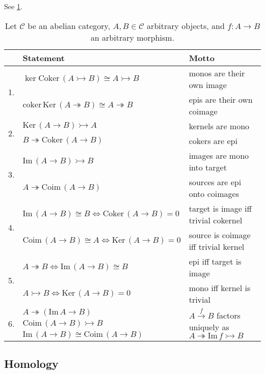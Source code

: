 \documentclass[10pt]{article}
\newcommand{\ccat}{\mathcal{C}}
\newcommand{\Coker}{\mathrm{Coker}\,}
\newcommand{\Coim}{\mathrm{Coim}\,}
\renewcommand{\Im}{\mathrm{Im}\,}
\newcommand{\Ker}{\mathrm{Ker}\,}
\newcommand{\coker}{\mathrm{coker}\,}
\newcommand{\mono}{\rightarrowtail}
\newcommand{\epi}{\twoheadrightarrow}
\begin{document}
            See \cref{tb:kernels-and-cokernels-in-abelian-category}.

            \begin{table}[!ht]
                \centering
                \begin{tabular}{rll}
                    & Statement & Motto\\[.2em]
                    \toprule
                    \multirow{2}{*}{1.}&$\ker\Coker(A\mono B)\cong A\mono B$ & monos are their own image\\
                    &$\coker\Ker(A\epi B)\cong A\epi B$ & epis are their own coimage\\[.4em]
                    \multirow{2}{*}{2.}&$\Ker(A\to B)\mono A$ & kernels are mono\\
                    &$B\epi\Coker(A\to B)$ & cokers are epi\\[.4em]
                    \multirow{2}{*}{3.}&$\Im(A\to B)\mono B$ & images are mono into target\\
                    &$A\epi\Coim(A\to B)$ & sources are epi onto coimages\\[.4em]
                    \multirow{2}{*}{4.}&$\Im(A\to B)\cong B\iff\Coker(A\to B)=0$ & target is image iff trivial cokernel\\
                    &$\Coim(A\to B)\cong A\iff\Ker(A\to B)=0$ & source is coimage iff trivial kernel\\[.4em]
                    \multirow{2}{*}{5.}&$A\epi B\iff \Im(A\to B)\cong B$ & epi iff target is image\\
                    &$A\mono B\iff \Ker(A\to B)=0$ & mono iff kernel is trivial\\[1em]
                    \multirow{3}{*}{6.}&$A\epi(\Im A\to B)$ & \multirow{3}{*}{$A\xrightarrow{f}B$ factors uniquely as $A\epi\Im f\mono B$}\\
                    &$\Coim(A\to B)\mono B$ & \\[.4em]
                    &$\Im(A\to B)\cong\Coim(A\to B)$ &
                \end{tabular}
                \caption{Let $\ccat$ be an abelian category, $A,B\in\ccat$ arbitrary objects, and $f\colon A\to B$ an arbitrary morphism.}\label{tb:kernels-and-cokernels-in-abelian-category}
            \end{table}

        \subsection{Homology}
\end{document}
